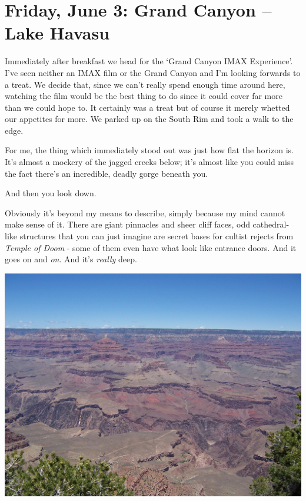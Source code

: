 \documentclass[a5paper,titlepage,11pt]{book}
\begin{document}
\chapter[Grand Canyon -- Lake Havasu]{Friday, June 3: Grand Canyon -- Lake Havasu}
Immediately after breakfast we head for the `Grand Canyon IMAX Experience'.  I've seen neither an IMAX film or the Grand Canyon and I'm looking forwards to a treat.  We decide that, since we can't really spend enough time around here, watching the film would be the best thing to do since it could cover far more than we could hope to. It certainly was a treat but of course it merely whetted our appetites for more.  We parked up on the South Rim and took a walk to the edge.

For me, the thing which immediately stood out was just how flat the horizon is.  It's almost a mockery of the jagged creeks below; it's almost like you could miss the fact there's an incredible, deadly gorge beneath you.

And then you look down.

Obviously it's beyond my means to describe, simply because my mind cannot make sense of it.  There are giant pinnacles and sheer cliff faces, odd cathedral-like structures that you can just imagine are secret bases for cultist rejects from \emph{Temple of Doom} - some of them even have what look like entrance doors.  And it goes on and \emph{on}.  And it's \emph{really} deep.

\begin{center}\includegraphics[width=\textwidth]{gfx/100_1458}\end{center}
\end{document}
